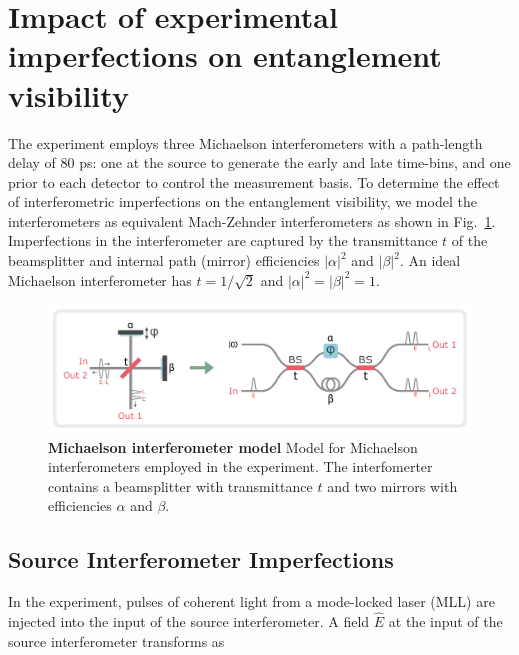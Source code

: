 \documentclass[11pt]{caltech_thesis} %
\begin{document}
\hypertarget{impact-of-experimental-imperfections-on-entanglement-visibility}{%
\section{Impact of experimental imperfections on entanglement visibility}\label{impact-of-experimental-imperfections-on-entanglement-visibility}}

The experiment employs three Michaelson interferometers with a path-length delay of 80 ps: one at the source to generate the early and late time-bins, and one prior to each detector to control the measurement basis. To determine the effect of interferometric imperfections on the entanglement visibility, we model the interferometers as equivalent Mach-Zehnder interferometers as shown in Fig.~\ref{fig:interf_model}. Imperfections in the interferometer are captured by the transmittance $t$ of the beamsplitter and internal path (mirror) efficiencies $|\alpha|^2$ and $|\beta|^2$. An ideal Michaelson interferometer has $t = 1/\sqrt{2}$ and $|\alpha|^2 = |\beta|^2 = 1$.

\hypertarget{fig:interf_model}{%
\begin{figure}
\centering
\includegraphics[width=1\textwidth,height=\textheight]{./chapter_09/figs/interf_model.png}
\caption[{Michaelson interferometer model}]{\textbf{Michaelson interferometer model} Model for Michaelson interferometers employed in the experiment. The interfomerter contains a beamsplitter with transmittance $t$ and two mirrors with efficiencies $\alpha$ and $\beta$.}
\label{fig:interf_model}
\end{figure}
}

\hypertarget{source-interferometer-imperfections}{%
\subsection{Source Interferometer Imperfections}\label{source-interferometer-imperfections}}

In the experiment, pulses of coherent light from a mode-locked laser (MLL) are injected into the input of the source interferometer. A field $\hat{E}$ at the input of the source interferometer transforms as
\end{document}
